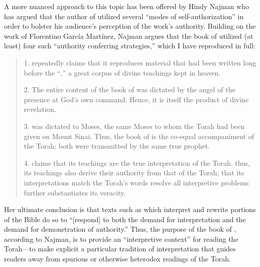 A more nuanced approach to this topic has been offered by Hindy Najman who has argued that the author of \jub utilized several ``modes of self-authorization'' in order to bolster his audience's perception of the work's authority.%
    \autocite[380]{najman_jsj1999}
Building on the work of Florentino García Martínez,\autocite{martinez_najman-tigchelaar2012} Najman argues that the book of \jub utilized (at least) four such ``authority conferring strategies,'' which I have reproduced in full:

    \begin{quote}
        1. \jub repeatedly claims that it reproduces material that had been written long before the ``\heavenlytablets,'' a great corpus of divine teachings kept in heaven.

        2. The entire content of the book of \jub was dictated by the angel of the presence at God's own command. Hence, it is itself the product of divine revelation.

        3. \jub was dictated to Moses, the same Moses to whom the Torah had been given on Mount Sinai. Thus, the book of \jub is the co-equal accompaniment of the Torah; both were transmitted by the same true prophet.

        4. \jub claims that its teachings are the true interpretation of the Torah. thus, its teachings also derive their authority from that of the Torah; that its interpretations match the Torah's words resolve all interpretive problems further substantiates its veracity.%
        \autocite[380]{najman_jsj1999}
    \end{quote}
\noindent
Her ultimate conclusion is that texts such as \jub which interpret and rewrite portions of the Bible do so to ``[respond] to both the demand for interpretation and the demand for demonstration of authority.''\autocite[408]{najman_jsj1999} Thus, the purpose of the book of \jub, according to Najman, is to provide an ``interpretive context'' for reading the Torah---to make explicit a particular tradition of interpretation that guides readers away from spurious or otherwise heterodox readings of the Torah. 


